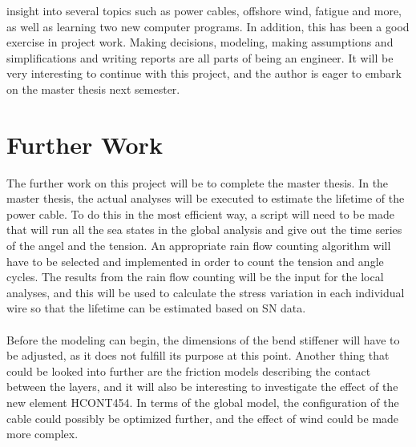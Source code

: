 insight into several topics such as power cables, offshore wind, fatigue and more, as well as learning two new computer programs. In addition, this has been a good exercise in project work. Making decisions, modeling, making assumptions and simplifications and writing reports are all parts of being an engineer. It will be very interesting to continue with this project, and the author is eager to embark on the master thesis next semester.

\section{Further Work}
The further work on this project will be to complete the master thesis. In the master thesis, the actual analyses will be executed to estimate the lifetime of the power cable. To do this in the most efficient way, a script will need to be made that will run all the sea states in the global analysis and give out the time series of the angel and the tension. An appropriate rain flow counting algorithm will have to be selected and implemented in order to count the tension and angle cycles. The results from the rain flow counting will be the input for the local analyses, and this will be used to calculate the stress variation in each individual wire so that the lifetime can be estimated based on SN data. \\\\Before the modeling can begin, the dimensions of the bend stiffener will have to be adjusted, as it does not fulfill its purpose at this point. Another thing that could be looked into further are the friction models describing the contact between the layers, and it will also be interesting to investigate the effect of the new element HCONT454. In terms of the global model, the configuration of the cable could possibly be optimized further, and the effect of wind could be made more complex. 

